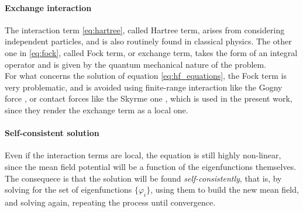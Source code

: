 \paragraph{Exchange interaction}
The interaction term \ref{eq:hartree}, called Hartree term, arises from considering independent particles, and is also routinely found in classical physics. The other one in \ref{eq:fock}, called Fock term, or exchange term, takes the form of an integral operator and is given by the quantum mechanical nature of the problem.
\\For what concerns the solution of equation \ref{eq:hf_equations}, the Fock term is very problematic, and is avoided using finite-range interaction like the Gogny force \cite{Robledo_2019}, or contact forces like the Skyrme one \cite{SKYRME1958615}, which is used in the present work, since they render the exchange term as a local one.
\paragraph{Self-consistent solution}
Even if the interaction terms are local, the equation is still highly non-linear, since the mean field potential will be a function of the eigenfunctions themselves. The consequece is that the solution will be found \textit{self-consistently}, that is, by solving for the set of eigenfunctions $\{\varphi_i\}$, using them to build the new mean field, and solving again, repeating the process until convergence.
